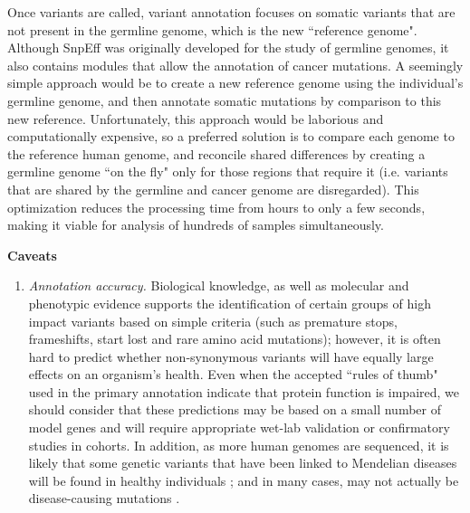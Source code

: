Once variants are called, variant annotation focuses on somatic variants that are not present in the germline genome, which is the new ``reference genome". Although SnpEff was originally developed for the study of germline genomes, it also contains modules that allow the annotation of cancer mutations. A seemingly simple approach would be to create a new reference genome using the individual’s germline genome, and then annotate somatic mutations by comparison to this new reference. Unfortunately, this approach would be laborious and computationally expensive, so a preferred solution is to compare each genome to the reference human genome, and reconcile shared differences by creating a germline genome ``on the fly" only for those regions that require it (i.e. variants that are shared by the germline and cancer genome are disregarded). This optimization reduces the processing time from hours to only a few seconds, making it viable for analysis of hundreds of samples simultaneously.

\textbf{Caveats}
	\begin{enumerate}[label=\roman*]

	\item \textit{Annotation accuracy.} Biological knowledge, as well as molecular and phenotypic evidence supports the identification of certain groups of high impact variants based on simple criteria (such as premature stops, frameshifts, start lost and rare amino acid mutations); however, it is often hard to predict whether non-synonymous variants will have equally large effects on an organism's health. Even when the accepted ``rules of thumb" used in the primary annotation indicate that protein function is impaired, we should consider that these predictions may be based on a small number of model genes and will require appropriate wet-lab validation or confirmatory studies in cohorts. In addition, as more human genomes are sequenced, it is likely that some genetic variants that have been linked to Mendelian diseases will be found in healthy individuals  \cite{riggs2013towards}; and in many cases, may not actually be disease-causing mutations  \cite{bell2011carrier}.
	
	\end{enumerate}

